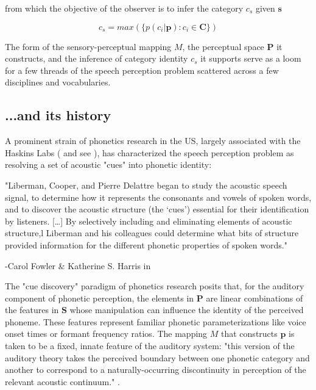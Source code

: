 \begin{multicols}{2}
from which the objective of the observer is to infer the category $c_s$ given $\mathbf{s}$ 

\begin{equation}
\label{eqn:infer}
c_s = max( \{ p(c_i | \mathbf{p}) : c_i \in \mathbf{C} \})
\end{equation}

The form of the sensory-perceptual mapping $M$, the perceptual space $\mathbf{P}$ it constructs, and the inference of category identity $c_s$ it supports serve as a loom for a few threads of the speech perception problem scattered across a few disciplines and vocabularies.

\subsection{...and its history}


A prominent strain of phonetics research in the US, largely associated with the Haskins Labs (\cite{schertzPhoneticCueWeighting2020} and see \cite[p.~51]{ohalaGuideHistoryPhonetic1999}), has characterized the speech perception problem as resolving a set of acoustic "cues" into phonetic identity:

\begin{leftbar}
"Liberman, Cooper, and Pierre Delattre began to study the acoustic speech signal, to determine how it represents the consonants and vowels of spoken words, and to discover the acoustic structure (the `cues') essential for their identification by listeners. [\dots] By selectively including and eliminating elements of acoustic structure,l Liberman and his colleagues could determine what bits of structure provided information for the different phonetic properties of spoken words."

-Carol Fowler \& Katherine S. Harris in \cite[p.~51]{ohalaGuideHistoryPhonetic1999}
\end{leftbar}

The "cue discovery" paradigm of phonetics research posits that, for the auditory component of phonetic perception, the elements in $\mathbf{P}$ are linear combinations of the features in $\mathbf{S}$ whose manipulation can influence the identity of the perceived phoneme. These features represent familiar phonetic parameterizations like voice onset times or formant frequency ratios. The mapping $M$ that constructs $\mathbf{p}$ is taken to be a fixed, innate feature of the auditory system: "this version of the auditory theory takes the perceived boundary between one phonetic category and another to correspond to a naturally-occurring discontinuity in perception of the relevant acoustic continuum." \cite{Liberman1985a}. 


\end{multicols}
